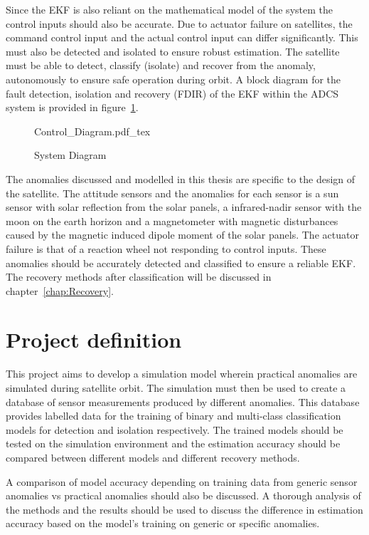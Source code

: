 Since the EKF is also reliant on the mathematical model of the system the control inputs should also be accurate. Due to actuator failure on satellites, the command control input and the actual control input can differ significantly. This must also be detected and isolated to ensure robust estimation. The satellite must be able to detect, classify (isolate) and recover from the anomaly, autonomously to ensure safe operation during orbit. A block diagram for the fault detection, isolation and recovery (FDIR) of the EKF within the ADCS system is provided in figure~\ref{fig:System_Diagram}.

\begin{figure}[h!b!t]
	\centering
	\def\svgwidth{14cm}
	{Control_Diagram.pdf_tex}
	\caption{System Diagram}
	\label{fig:System_Diagram}
\end{figure}

The anomalies discussed and modelled in this thesis are specific to the design of the satellite. The attitude sensors and the anomalies for each sensor is a sun sensor with solar reflection from the solar panels, a infrared-nadir sensor with the moon on the earth horizon and a magnetometer with magnetic disturbances caused by the magnetic induced dipole moment of the solar panels. The actuator failure is that of a reaction wheel not responding to control inputs. These anomalies should be accurately detected and classified to ensure a reliable EKF. The recovery methods after classification will be discussed in chapter~\ref{chap:Recovery}.

\section{Project definition}
This project aims to develop a simulation model wherein practical anomalies are simulated during satellite orbit. The simulation must then be used to create a database of sensor measurements produced by different anomalies. This database provides labelled data for the training of binary and multi-class classification models for detection and isolation respectively. The trained models should be tested on the simulation environment and the estimation accuracy should be compared between different models and different recovery methods.

A comparison of model accuracy depending on training data from generic sensor anomalies vs practical anomalies should also be discussed. A thorough analysis of the methods and the results should be used to discuss the difference in estimation accuracy based on the model's training on generic or specific anomalies. 

